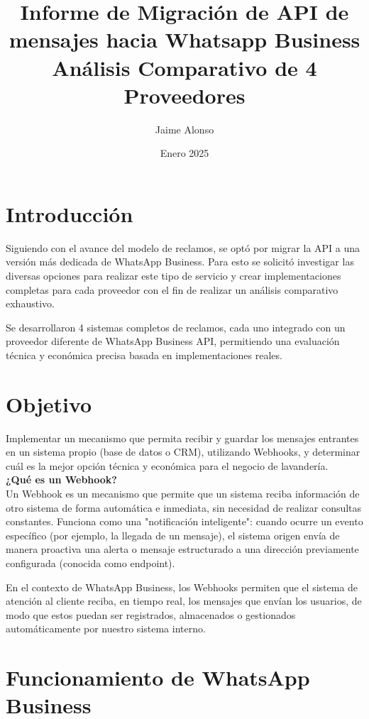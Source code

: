 \documentclass{article}
\title{Informe de Migración de API de mensajes hacia Whatsapp Business\\
\large Análisis Comparativo de 4 Proveedores}
\author{Jaime Alonso}
\date{Enero 2025}
\begin{document}
\maketitle

\tableofcontents
\newpage

\section{Introducción}
\textnormal{Siguiendo con el avance del modelo de reclamos, se optó por migrar la API a una versión más dedicada de WhatsApp Business. Para esto se solicitó investigar las diversas opciones para realizar este tipo de servicio y crear implementaciones completas para cada proveedor con el fin de realizar un análisis comparativo exhaustivo.}

\textnormal{Se desarrollaron 4 sistemas completos de reclamos, cada uno integrado con un proveedor diferente de WhatsApp Business API, permitiendo una evaluación técnica y económica precisa basada en implementaciones reales.}

\section{Objetivo}
\textnormal{Implementar un mecanismo que permita recibir y guardar los mensajes entrantes en un sistema propio (base de datos o CRM), utilizando Webhooks, y determinar cuál es la mejor opción técnica y económica para el negocio de lavandería.}\\

\textbf{¿Qué es un Webhook?}\\
Un Webhook es un mecanismo que permite que un sistema reciba información de otro sistema de forma automática e inmediata, sin necesidad de realizar consultas constantes. Funciona como una "notificación inteligente": cuando ocurre un evento específico (por ejemplo, la llegada de un mensaje), el sistema origen envía de manera proactiva una alerta o mensaje estructurado a una dirección previamente configurada (conocida como endpoint).

En el contexto de WhatsApp Business, los Webhooks permiten que el sistema de atención al cliente reciba, en tiempo real, los mensajes que envían los usuarios, de modo que estos puedan ser registrados, almacenados o gestionados automáticamente por nuestro sistema interno.

\section{Funcionamiento de WhatsApp Business}
\end{document}
